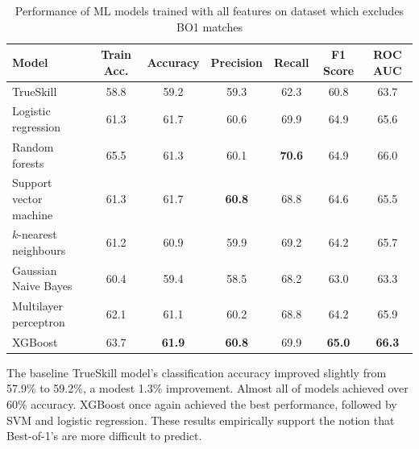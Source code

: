 \begin{table}[h!]
	\centering
	\small
	\begin{adjustbox}{center} %
		\begin{tabular}{ |l|c|c|c|c|c|c| }
			\hline
			\rule{0pt}{2.6ex} \textbf{Model} & \textbf{Train Acc.} & \textbf{Accuracy} & \textbf{Precision} & \textbf{Recall} & \textbf{F1 Score} & \textbf{ROC AUC} \\
			\hline
			\rule{0pt}{2.6ex} TrueSkill                 & 58.8 & 59.2 & 59.3 & 62.3 & 60.8 & 63.7 \\ \hline
			\rule{0pt}{2.6ex} Logistic regression       & 61.3 & 61.7 & 60.6 & 69.9 & 64.9 & 65.6 \\
			\rule{0pt}{2.6ex} Random forests            & 65.5 & 61.3 & 60.1 & \textbf{70.6} & 64.9 & 66.0 \\
			\rule{0pt}{2.6ex} Support vector machine    & 61.3 & 61.7 & \textbf{60.8} & 68.8 & 64.6 & 65.5 \\
			\rule{0pt}{2.6ex} $k$-nearest neighbours 	& 61.2 & 60.9 & 59.9 & 69.2 & 64.2 & 65.7 \\
			\rule{0pt}{2.6ex} Gaussian Naive Bayes      & 60.4 & 59.4 & 58.5 & 68.2 & 63.0 & 63.3 \\
			\rule{0pt}{2.6ex} Multilayer perceptron     & 62.1 & 61.1 & 60.2 & 68.8 & 64.2 & 65.9 \\
			\rule{0pt}{2.6ex} XGBoost                   & 63.7 & \textbf{61.9} & \textbf{60.8} & 69.9 & \textbf{65.0} & \textbf{66.3} \\
			\hline
		\end{tabular}
	\end{adjustbox}
	\caption{Performance of ML models trained with all features on dataset which excludes BO1 matches}
	\label{table:3}
\end{table}

The baseline TrueSkill model's classification accuracy improved slightly from 57.9\% to 59.2\%, a modest 1.3\% improvement. Almost all of models achieved over 60\% accuracy. XGBoost once again achieved the best performance, followed by SVM and logistic regression. These results empirically support the notion that Best-of-1's are more difficult to predict.



